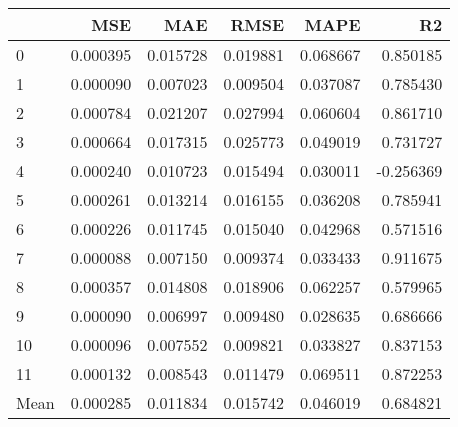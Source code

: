 \begin{tabular}{lrrrrr}
\toprule
 & MSE & MAE & RMSE & MAPE & R2 \\
\midrule
0 & 0.000395 & 0.015728 & 0.019881 & 0.068667 & 0.850185 \\
1 & 0.000090 & 0.007023 & 0.009504 & 0.037087 & 0.785430 \\
2 & 0.000784 & 0.021207 & 0.027994 & 0.060604 & 0.861710 \\
3 & 0.000664 & 0.017315 & 0.025773 & 0.049019 & 0.731727 \\
4 & 0.000240 & 0.010723 & 0.015494 & 0.030011 & -0.256369 \\
5 & 0.000261 & 0.013214 & 0.016155 & 0.036208 & 0.785941 \\
6 & 0.000226 & 0.011745 & 0.015040 & 0.042968 & 0.571516 \\
7 & 0.000088 & 0.007150 & 0.009374 & 0.033433 & 0.911675 \\
8 & 0.000357 & 0.014808 & 0.018906 & 0.062257 & 0.579965 \\
9 & 0.000090 & 0.006997 & 0.009480 & 0.028635 & 0.686666 \\
10 & 0.000096 & 0.007552 & 0.009821 & 0.033827 & 0.837153 \\
11 & 0.000132 & 0.008543 & 0.011479 & 0.069511 & 0.872253 \\
Mean & 0.000285 & 0.011834 & 0.015742 & 0.046019 & 0.684821 \\
\bottomrule
\end{tabular}
